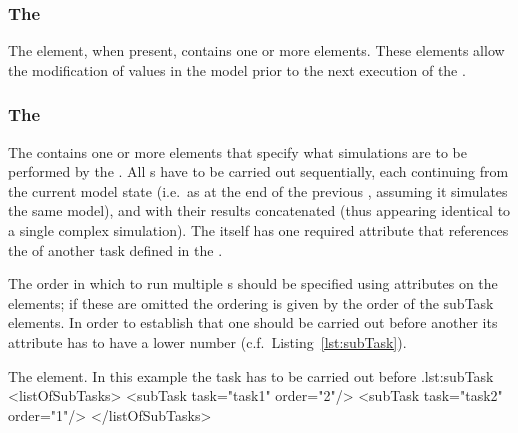 \subsubsection{The }
\label{sec:changes}
The  element, when present, contains one or more  elements. These elements allow the modification of values in the model prior to the next execution of the .

\subsubsection{The }
\label{class:subTask}
The  contains one or more  elements that specify what simulations are to be performed by the .
All s have to be carried out sequentially, each continuing from the current model state (i.e.\ as at the end of the previous , assuming it simulates the same model), and with their results concatenated (thus appearing identical to a single complex simulation). The  itself has one required attribute  that references the  of another task defined in the .

The order in which to run multiple s should be specified using  attributes on the  elements; if these are omitted the ordering is given by the order of the subTask elements.
In order to establish that one  should be carried out before another its  attribute has to have a lower number (c.f.\ Listing~\ref{lst:subTask}).

\begin{myXmlLst}{The  element. In this example the task  has to be carried out before .}{lst:subTask}
<listOfSubTasks>
	<subTask task="task1" order="2"/> 
	<subTask task="task2" order="1"/> 
</listOfSubTasks>
\end{myXmlLst}
